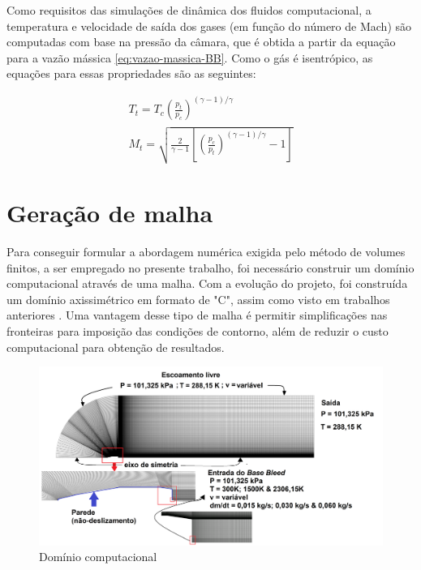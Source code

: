 Como requisitos das simulações de dinâmica dos fluidos computacional, a temperatura e velocidade de saída dos gases (em função do número de Mach) são computadas com base na pressão da câmara, que é obtida a partir da equação para a vazão mássica \ref{eq:vazao-massica-BB}. Como o gás é isentrópico, as equações para essas propriedades são as seguintes:

\begin{align}
    \label{eq:temperatura-BB}
    T_{t} = T_{c}\left(\frac{p_t}{p_c}\right)^{(\gamma - 1)/\gamma} \\
    \label{eq:velocidade-mach-BB}
    M_{t} = \sqrt{\frac{2}{\gamma - 1}\left[\left(\frac{p_c}{p_t}\right)^{(\gamma - 1)/\gamma}-1\right]}
\end{align}

\section{Geração de malha}\label{sec:geracao-malha}

Para conseguir formular a abordagem numérica exigida pelo método de volumes finitos, a ser empregado no presente trabalho, foi necessário construir um domínio computacional através de uma malha. Com a evolução do projeto, foi construída um domínio axissimétrico em formato de "C", assim como visto em trabalhos anteriores \cite{Mahmoud2009,nicolas-perez_accuracy_2017}. Uma vantagem desse tipo de malha é permitir simplificações nas fronteiras para imposição das condições de contorno, além de reduzir o custo computacional para obtenção de resultados.

\begin{figure}[!ht]
	\centering
	\includegraphics[width=1.0\textwidth]{foto01-malha.png}
	\caption{Domínio computacional}
	\label{fig12:autor-malha}
\end{figure}

